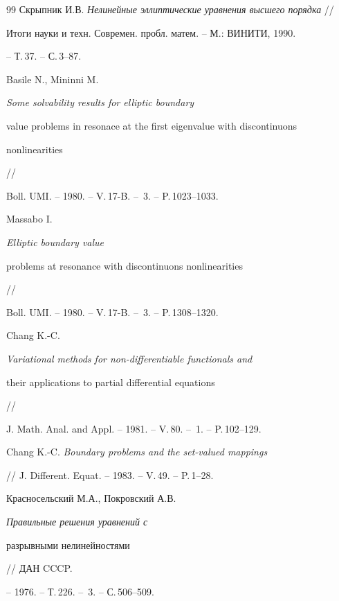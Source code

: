 \begin{thebibliography}{99}
Скрыпник И.В. {\em Нелинейные эллиптические уравнения высшего порядка} //


Итоги науки и техн. Современ. пробл. матем. -- М.: ВИНИТИ, 1990.


-- Т.\,37. -- С.\,3--87.







Basile N., Mininni M. {\em Some solvability results for elliptic boundary


value problems in resonace at the first eigenvalue with discontinuons


nonlinearities} // 


Boll. UMI. -- 1980. -- V.\,17-B. -- \No\,3. -- P.\,1023--1033.







Massabo I. {\em Elliptic boundary value


problems at resonance with discontinuons nonlinearities} //


Boll. UMI. -- 1980. -- V.\,17-B. -- \No\,3. -- P.\,1308--1320.







Chang K.-C. {\em Variational methods for non-differentiable functionals and


their applications to partial differential equations} // 


J. Math. Anal. and Appl. -- 1981. -- V.\,80. -- \No\,1. -- P.\,102--129.







Chang K.-C. {\em Boundary problems and the set-valued mappings}


// J. Different. Equat. -- 1983. -- V.\,49. -- P.\,1--28.







Красносельский М.А., Покровский А.В. {\em Правильные решения уравнений с


разрывными нелинейностями} // ДАН CCCP.


-- 1976. -- Т.\,226. -- \No\,3. -- С.\,506--509.








\end{thebibliography}
